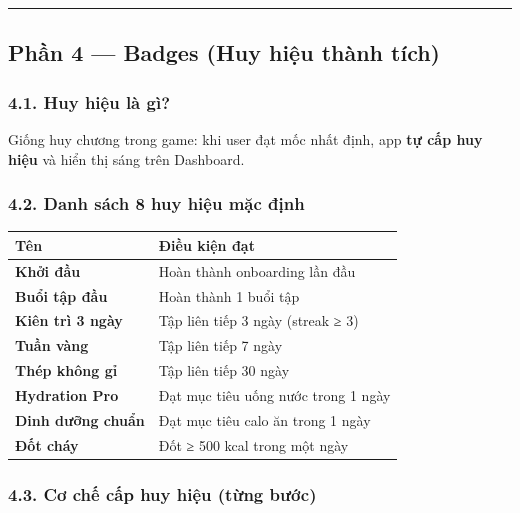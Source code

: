 \documentclass[12pt,a4paper]{article}
\begin{document}
\begin{center}\rule{0.5\linewidth}{0.5pt}\end{center}

\subsection{Phần 4 --- Badges (Huy hiệu thành
tích)}\label{phux1ea7n-4-badges-huy-hiux1ec7u-thuxe0nh-tuxedch}

\subsubsection{4.1. Huy hiệu là gì?}\label{huy-hiux1ec7u-luxe0-guxec}

Giống huy chương trong game: khi user đạt mốc nhất định, app \textbf{tự
cấp huy hiệu} và hiển thị sáng trên Dashboard.

\subsubsection{4.2. Danh sách 8 huy hiệu mặc
định}\label{danh-suxe1ch-8-huy-hiux1ec7u-mux1eb7c-ux111ux1ecbnh}

{\def\LTcaptype{none} %
\begin{longtable}[]{@{}ll@{}}
\toprule\noalign{}
Tên & Điều kiện đạt \\
\midrule\noalign{}
\endhead
\bottomrule\noalign{}
\endlastfoot
\textbf{Khởi đầu} & Hoàn thành onboarding lần đầu \\
\textbf{Buổi tập đầu} & Hoàn thành 1 buổi tập \\
\textbf{Kiên trì 3 ngày} & Tập liên tiếp 3 ngày (streak ≥ 3) \\
\textbf{Tuần vàng} & Tập liên tiếp 7 ngày \\
\textbf{Thép không gỉ} & Tập liên tiếp 30 ngày \\
\textbf{Hydration Pro} & Đạt mục tiêu uống nước trong 1 ngày \\
\textbf{Dinh dưỡng chuẩn} & Đạt mục tiêu calo ăn trong 1 ngày \\
\textbf{Đốt cháy} & Đốt ≥ 500 kcal trong một ngày \\
\end{longtable}
}

\subsubsection{4.3. Cơ chế cấp huy hiệu (từng
bước)}\label{cux1a1-chux1ebf-cux1ea5p-huy-hiux1ec7u-tux1eebng-bux1b0ux1edbc}
\end{document}
